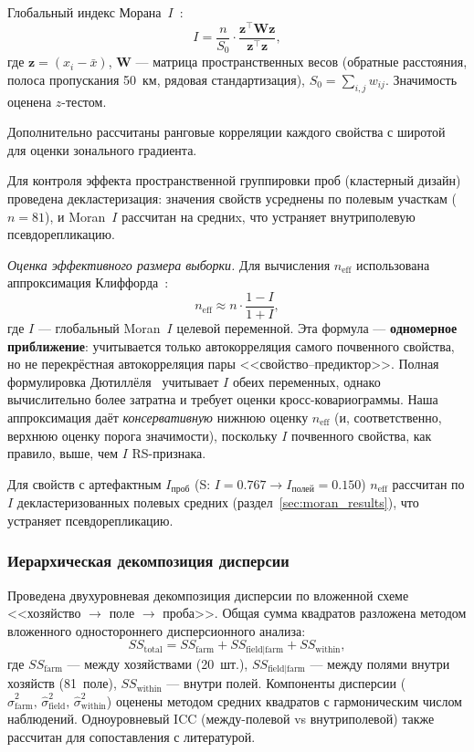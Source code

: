 Глобальный индекс Морана~$I$~\citep{Goovaerts1999, Webster2007}:
\begin{equation}
I = \frac{n}{S_0} \cdot \frac{\mathbf{z}^\top \mathbf{W} \mathbf{z}}{\mathbf{z}^\top \mathbf{z}},
\label{eq:moran}
\end{equation}
где $\mathbf{z} = (x_i - \bar{x})$, $\mathbf{W}$ --- матрица пространственных весов (обратные расстояния, полоса пропускания 50~км, рядовая стандартизация), $S_0 = \sum_{i,j} w_{ij}$. Значимость оценена $z$-тестом.

Дополнительно рассчитаны ранговые корреляции каждого свойства с широтой для оценки зонального градиента.

Для контроля эффекта пространственной группировки проб (кластерный дизайн) проведена декластеризация: значения свойств усреднены по полевым участкам ($n = 81$), и Moran~$I$ рассчитан на средниx, что устраняет внутриполевую псевдорепликацию.

\textit{Оценка эффективного размера выборки.} Для вычисления $n_{\text{eff}}$ использована аппроксимация Клиффорда~\citep{Clifford1989}:
\begin{equation}
n_{\text{eff}} \approx n \cdot \frac{1 - I}{1 + I},
\label{eq:neff}
\end{equation}
где $I$ --- глобальный Moran~$I$ целевой переменной. Эта формула --- \textbf{одномерное приближение}: учитывается только автокорреляция самого почвенного свойства, но не перекрёстная автокорреляция пары <<свойство--предиктор>>. Полная формулировка Дютиллёля~\citep{Dutilleul1993} учитывает $I$ обеих переменных, однако вычислительно более затратна и требует оценки кросс-ковариограммы. Наша аппроксимация даёт \textit{консервативную} нижнюю оценку $n_{\text{eff}}$ (и, соответственно, верхнюю оценку порога значимости), поскольку $I$ почвенного свойства, как правило, выше, чем $I$ RS-признака.

Для свойств с артефактным $I_{\text{проб}}$ (S: $I = 0.767 \to I_{\text{полей}} = 0.150$) $n_{\text{eff}}$ рассчитан по $I$ декластеризованных полевых средних (раздел~\ref{sec:moran_results}), что устраняет псевдорепликацию.

\subsubsection{Иерархическая декомпозиция дисперсии}
\label{sec:variance_decomp_method}

Проведена двухуровневая декомпозиция дисперсии по вложенной схеме <<хозяйство $\to$ поле $\to$ проба>>. Общая сумма квадратов разложена методом вложенного одностороннего дисперсионного анализа:
\begin{equation}
SS_{\text{total}} = SS_{\text{farm}} + SS_{\text{field}|\text{farm}} + SS_{\text{within}},
\end{equation}
где $SS_{\text{farm}}$ --- между хозяйствами (20~шт.), $SS_{\text{field}|\text{farm}}$ --- между полями внутри хозяйств (81~поле), $SS_{\text{within}}$ --- внутри полей. Компоненты дисперсии ($\hat{\sigma}^2_{\text{farm}},\, \hat{\sigma}^2_{\text{field}},\, \hat{\sigma}^2_{\text{within}}$) оценены методом средних квадратов с гармоническим числом наблюдений. Одноуровневый ICC (между-полевой vs внутриполевой) также рассчитан для сопоставления с литературой.

